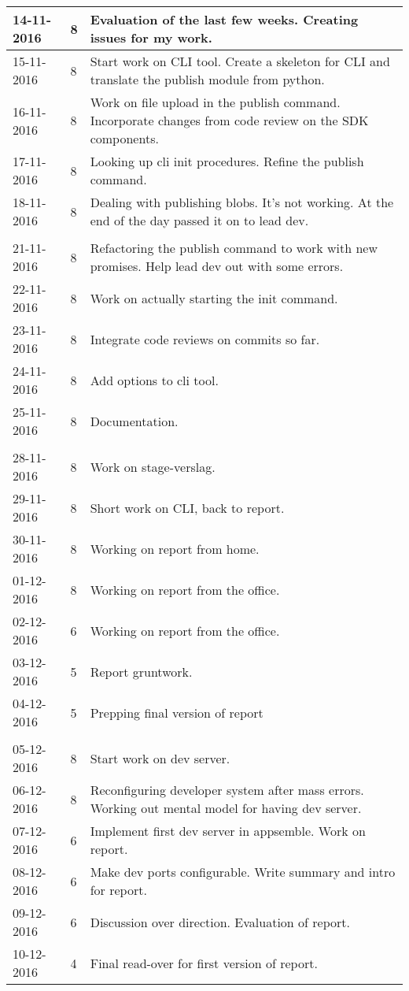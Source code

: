 \begin{tabular}{|p{2cm}|p{1cm}|p{10cm}|}
	\hline
	14-11-2016 & 8 & Evaluation of the last few weeks. Creating issues for my work. \\ \hline
	15-11-2016 & 8 & Start work on CLI tool. Create a skeleton for CLI and translate the publish module from python. \\ \hline
	16-11-2016 & 8 & Work on file upload in the publish command. Incorporate changes from code review on the SDK components. \\ \hline
	17-11-2016 & 8 & Looking up cli init procedures. Refine the publish command. \\ \hline
	18-11-2016 & 8 & Dealing with publishing blobs. It's not working. At the end of the day passed it on to lead dev. \\ \hline
	
	\\ \hline
	
	21-11-2016 & 8 & Refactoring the publish command to work with new promises. Help lead dev out with some errors. \\ \hline
	22-11-2016 & 8 & Work on actually starting the init command. \\ \hline
	23-11-2016 & 8 & Integrate code reviews on commits so far. \\ \hline
	24-11-2016 & 8 & Add options to cli tool. \\ \hline
	25-11-2016 & 8 & Documentation. \\ \hline
	
	\\ \hline
	
	28-11-2016 & 8 & Work on stage-verslag. \\ \hline
	29-11-2016 & 8 & Short work on CLI, back to report. \\ \hline
	30-11-2016 & 8 & Working on report from home. \\ \hline
	01-12-2016 & 8 & Working on report from the office. \\ \hline
	02-12-2016 & 6 & Working on report from the office. \\ \hline
	03-12-2016 & 5 & Report gruntwork. \\ \hline
	04-12-2016 & 5 & Prepping final version of report \\ \hline
	
	\\ \hline
	
	05-12-2016 & 8 & Start work on dev server. \\ \hline
	06-12-2016 & 8 & Reconfiguring developer system after mass errors. Working out mental model for having dev server. \\ \hline
	07-12-2016 & 6 & Implement first dev server in appsemble. Work on report. \\ \hline
	08-12-2016 & 6 & Make dev ports configurable. Write summary and intro for report. \\ \hline
	09-12-2016 & 6 & Discussion over direction. Evaluation of report. \\ \hline
	10-12-2016 & 4 & Final read-over for first version of report. \\ \hline
\end{tabular}